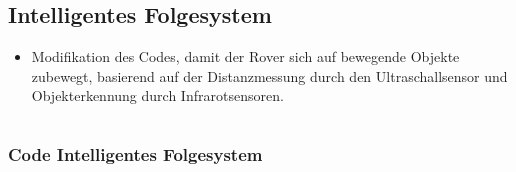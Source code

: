 \documentclass{vorlage-design-main}
\begin{document}
\newpage

\hypertarget{intelligentes-folgesystem}{%
\subsection{Intelligentes Folgesystem}\label{intelligentes-folgesystem}}

\begin{itemize}

\item
  Modifikation des Codes, damit der Rover sich auf bewegende Objekte
  zubewegt, basierend auf der Distanzmessung durch den Ultraschallsensor
  und Objekterkennung durch Infrarotsensoren.
\end{itemize}

\newpage

\begin{lstlisting}
\end{lstlisting}

\newpage

\hypertarget{code-intelligentes-folgesystem}{%
\subsubsection{Code Intelligentes
Folgesystem}\label{code-intelligentes-folgesystem}}
\end{document}
